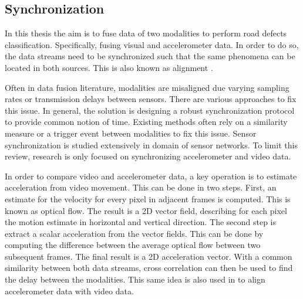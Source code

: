




\subsection{Synchronization}
In this thesis the aim is to fuse data of two modalities to perform road defects classification. Specifically, fusing visual and accelerometer data. In order to do so, the data streams need to be synchronized such that the same phenomena can be located in both sources. This is also known as alignment \cite{Baltrusaitis2017}.

Often in data fusion literature, modalities are misaligned due varying sampling rates or transmission delays between sensors. There are various approaches to fix this issue. In general, the solution is designing a robust synchronization protocol to provide common notion of time. Existing methods often rely on a similarity measure or a trigger event between modalities to fix this issue.  Sensor synchronization is studied extensively in domain of sensor networks. To limit this review, research is only focused on synchronizing accelerometer and video data.

In order to compare video and accelerometer data, a key operation is to estimate acceleration from video movement. This can be done in two steps. First, an estimate for the velocity for every pixel in adjacent frames is computed. This is known as optical flow. The result is a 2D vector field, describing for each pixel the motion estimate in horizontal and vertical direction. The second step is extract a scalar acceleration from the vector fields. This can be done by computing the difference between the average optical flow between two subsequent frames. The final result is a 2D acceleration vector. With a common similarity between both data streams, cross correlation can then be used to find the delay between the modalities. This same idea is also used in \cite{Fridman2015, Zhang2020} to align accelerometer data with video data. 

